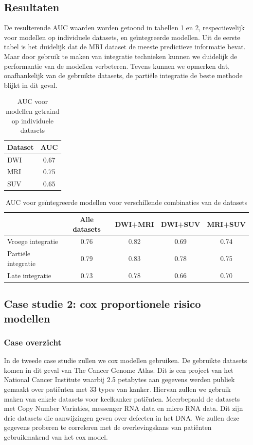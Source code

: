 \begin{abstract*}
\subsection{Resultaten}
De resulterende AUC waarden worden getoond in tabellen \ref{tab:D:evaluation-auc-individual} en \ref{tab:D:evaluation-auc-integrated}, respectievelijk voor modellen op individuele datasets, en ge\"integreerde modellen.
Uit de eerste tabel is het duidelijk dat de MRI dataset de meeste predictieve informatie bevat. Maar door gebruik te maken van integratie technieken kunnen we duidelijk de performantie van de modellen verbeteren. Tevens kunnen we opmerken dat, onafhankelijk van de gebruikte datasets, de parti\"ele integratie de beste methode blijkt in dit geval.
\begin{table}
	\centering
	\begin{tabular}{lc}
		\toprule
		Dataset & AUC \\
		\midrule
		DWI & 0.67 \\
		MRI & 0.75 \\
		SUV & 0.65 \\
		\bottomrule
	\end{tabular}
	\caption{AUC voor modellen getraind op individuele datasets}
	\label{tab:D:evaluation-auc-individual}
\end{table}
\begin{table}
	\centering
	\begin{tabular}{lcccc}
		\toprule
		& Alle datasets & DWI+MRI & DWI+SUV & MRI+SUV \\
		\midrule
		Vroege integratie & 0.76 & 0.82 & 0.69 & 0.74 \\
		Parti\"ele integratie & 0.79 & 0.83 & 0.78 & 0.75 \\
		Late integratie & 0.73 & 0.78 & 0.66 & 0.70 \\
		\bottomrule
	\end{tabular}
	\caption{AUC voor ge\"integreerde modellen voor verschillende combinaties van de datasets}
	\label{tab:D:evaluation-auc-integrated}
\end{table}
\subsection{Case studie 2: cox proportionele risico modellen}
\subsubsection{Case overzicht}
In de tweede case studie zullen we cox modellen gebruiken. De gebruikte datasets komen in dit geval van The Cancer Genome Atlas. Dit is een project van het National Cancer Institute waarbij 2.5 petabytes aan gegevens werden publiek gemaakt over pati\"enten met 33 types van kanker. Hiervan zullen we gebruik maken van enkele datasets voor keelkanker pati\"enten. Meerbepaald de datasets met Copy Number Variaties, messenger RNA data en micro RNA data. Dit zijn drie datasets die aanwijzingen geven over defecten in het DNA. We zullen deze gegevens proberen te correleren met de overlevingskans van pati\"enten gebruikmakend van het cox model.

\end{abstract*}
